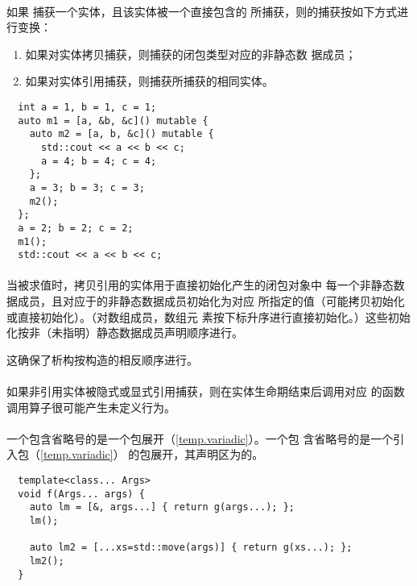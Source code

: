 \paragraph{} %
如果 捕获一个实体，且该实体被一个直接包含的
 所捕获，则的捕获按如下方式进行变换：
\begin{enumerate}
  \item 如果对实体拷贝捕获，则捕获的闭包类型对应的非静态数
        据成员；
  \item 如果对实体引用捕获，则捕获所捕获的相同实体。
\end{enumerate}

\begin{example}
  \begin{lstlisting}
  int a = 1, b = 1, c = 1;
  auto m1 = [a, &b, &c]() mutable {
    auto m2 = [a, b, &c]() mutable {
      std::cout << a << b << c;
      a = 4; b = 4; c = 4;
    };
    a = 3; b = 3; c = 3;
    m2();
  };
  a = 2; b = 2; c = 2;
  m1();
  std::cout << a << b << c;
  \end{lstlisting}
\end{example}

\paragraph{} %
当被求值时，拷贝引用的实体用于直接初始化产生的闭包对象中
每一个非静态数据成员，且对应于的非静态数据成员初始化为对应
所指定的值（可能拷贝初始化或直接初始化）。（对数组成员，数组元
素按下标升序进行直接初始化。）这些初始化按非（未指明）静态数据成员声明顺序进行。

\begin{note}
  这确保了析构按构造的相反顺序进行。
\end{note}

\paragraph{} %
\begin{note}
  如果非引用实体被隐式或显式引用捕获，则在实体生命期结束后调用对应
  的函数调用算子很可能产生未定义行为。
\end{note}

\paragraph{} %
一个包含省略号的是一个包展开（\ref{temp.variadic}）。一个包
含省略号的是一个引入包（\ref{temp.variadic}）
的包展开，其声明区为的。

\begin{example}
  \begin{lstlisting}
  template<class... Args>
  void f(Args... args) {
    auto lm = [&, args...] { return g(args...); };
    lm();

    auto lm2 = [...xs=std::move(args)] { return g(xs...); };
    lm2();
  }
  \end{lstlisting}
\end{example}
